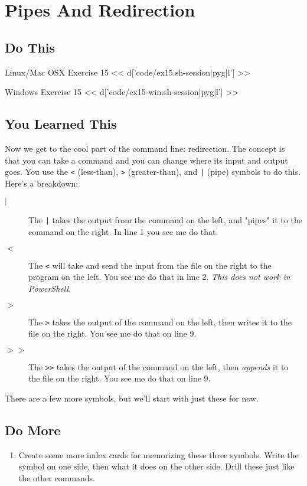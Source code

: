 \chapter{Pipes And Redirection}

\section{Do This}

\begin{code}{Linux/Mac OSX Exercise 15}
<< d['code/ex15.sh-session|pyg|l'] >>
\end{code}

\begin{code}{Windows Exercise 15}
<< d['code/ex15-win.sh-session|pyg|l'] >>
\end{code}

\section{You Learned This}

Now we get to the cool part of the command line: redirection.  The concept is
that you can take a command and you can change where its input and output goes. 
You use the \verb|<| (less-than), \verb|>| (greater-than), and \verb,|, (pipe) 
symbols to do this.  Here's a breakdown:

\begin{description}
\item[$|$] The \verb,|, takes the output from the command on the left, and "pipes" it to the command on the right.  In line 1 you see me do that.
\item[$<$] The \verb|<| will take and send the input from the file on the right to the program on the left.  You see me do that in line 2. \emph{This does not work in PowerShell}.
\item[$>$] The \verb|>| takes the output of the command on the left, then writes it
    to the file on the right.  You see me do that on line 9. 
\item[$>>$] The \verb|>>| takes the output of the command on the left, then \emph{appends} it
    to the file on the right.  You see me do that on line 9.
\end{description}

There are a few more symbols, but we'll start with just these for now.

\section{Do More}

\begin{enumerate}
\item Create some more index cards for memorizing these three symbols.  Write the symbol on one side, then what it does on the other side.  Drill these just like the other commands.
\end{enumerate}

